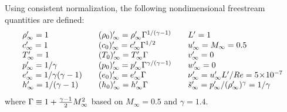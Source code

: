 Using consistent normalization, the following nondimensional freestream
quantities are defined:
$$
\begin{array}{l@{\qquad}l@{\qquad}l}
 \rho'_\infty = 1 & 
 (\rho_0)'_\infty = \rho'_\infty \Gamma^{1/(\gamma - 1)} &
 L' = 1 \\
 c'_\infty = 1 & 
 (c_0)'_\infty = c'_\infty \Gamma^{1/2} &
 u'_\infty = M_\infty = 0.5 \\
 T'_\infty = 1 & 
 (T_0)'_\infty = T'_\infty \Gamma &
 v'_\infty = 0 \\
 p'_\infty = 1/\gamma & 
 (p_0)'_\infty = p'_\infty \Gamma^{\gamma/(\gamma - 1)} &
 w'_\infty = 0 \\
 e'_\infty = 1/\gamma(\gamma - 1) & 
 (e_0)'_\infty = e'_\infty \Gamma &
 \nu'_\infty = u'_\infty L'/Re = 5\!\times\!10^{-7} \\
 h'_\infty = 1/(\gamma - 1) & 
 (h_0)'_\infty = h'_\infty \Gamma &
 \tilde{s}'_\infty = p'_\infty/(\rho'_\infty)^\gamma = 1/\gamma 
\end{array}
$$
where $\Gamma \equiv 1 + {\gamma - 1 \over 2} M_\infty^2$ based on $M_\infty = 0.5$
and $\gamma = 1.4$.

